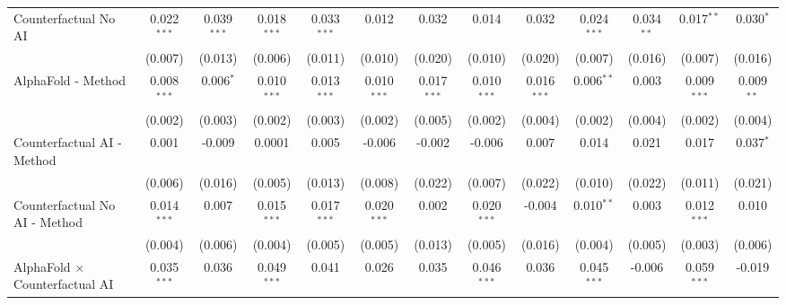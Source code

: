 \begin{tabular}{lcccccccccccc}
   Counterfactual No AI                                       & 0.022$^{***}$ & 0.039$^{***}$ & 0.018$^{***}$  & 0.033$^{***}$  & 0.012         & 0.032          & 0.014         & 0.032          & 0.024$^{***}$ & 0.034$^{**}$ & 0.017$^{**}$  & 0.030$^{*}$\\   
                                                              & (0.007)       & (0.013)       & (0.006)        & (0.011)        & (0.010)       & (0.020)        & (0.010)       & (0.020)        & (0.007)       & (0.016)      & (0.007)       & (0.016)\\   
   AlphaFold - Method                                         & 0.008$^{***}$ & 0.006$^{*}$   & 0.010$^{***}$  & 0.013$^{***}$  & 0.010$^{***}$ & 0.017$^{***}$  & 0.010$^{***}$ & 0.016$^{***}$  & 0.006$^{**}$  & 0.003        & 0.009$^{***}$ & 0.009$^{**}$\\   
                                                              & (0.002)       & (0.003)       & (0.002)        & (0.003)        & (0.002)       & (0.005)        & (0.002)       & (0.004)        & (0.002)       & (0.004)      & (0.002)       & (0.004)\\   
   Counterfactual AI - Method                                 & 0.001         & -0.009        & 0.0001         & 0.005          & -0.006        & -0.002         & -0.006        & 0.007          & 0.014         & 0.021        & 0.017         & 0.037$^{*}$\\   
                                                              & (0.006)       & (0.016)       & (0.005)        & (0.013)        & (0.008)       & (0.022)        & (0.007)       & (0.022)        & (0.010)       & (0.022)      & (0.011)       & (0.021)\\   
   Counterfactual No AI - Method                              & 0.014$^{***}$ & 0.007         & 0.015$^{***}$  & 0.017$^{***}$  & 0.020$^{***}$ & 0.002          & 0.020$^{***}$ & -0.004         & 0.010$^{**}$  & 0.003        & 0.012$^{***}$ & 0.010\\   
                                                              & (0.004)       & (0.006)       & (0.004)        & (0.005)        & (0.005)       & (0.013)        & (0.005)       & (0.016)        & (0.004)       & (0.005)      & (0.003)       & (0.006)\\   
   AlphaFold $\times$ Counterfactual AI                       & 0.035$^{***}$ & 0.036         & 0.049$^{***}$  & 0.041          & 0.026         & 0.035          & 0.046$^{***}$ & 0.036          & 0.045$^{***}$ & -0.006       & 0.059$^{***}$ & -0.019\\   

\end{tabular}
